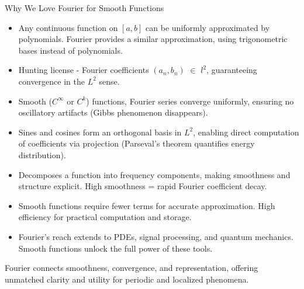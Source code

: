 \begin{frame}[allowframebreaks]{Why We Love Fourier for Smooth Functions}
    \begin{itemize}
        \item {} 
        Any continuous function on \([a, b]\) can be uniformly approximated by polynomials. Fourier provides a similar approximation, using trigonometric bases instead of polynomials.
        
        \item {} 
        Hunting license - Fourier coefficients \((a_n, b_n)\) $\in$ \(l^2\), guaranteeing convergence in the \(L^2\) sense.

        \item {} 
       Smooth (\(C^\infty\) or \(C^k\)) functions, Fourier series converge uniformly, ensuring no oscillatory artifacts (Gibbs phenomenon disappears).

        \item {} 
        Sines and cosines form an orthogonal basis in \(L^2\), enabling direct computation of coefficients via projection (Parseval's theorem quantifies energy distribution).

        \item {} 
        Decomposes a function into frequency components, making smoothness and structure explicit. High smoothness = rapid Fourier coefficient decay.

        \item {} 
        Smooth functions require fewer terms for accurate approximation. High efficiency for practical computation and storage.

        \item {} 
        Fourier's reach extends to PDEs, signal processing, and quantum mechanics. Smooth functions unlock the full power of these tools.
    \end{itemize}
    \vspace{1em}
     Fourier connects smoothness, convergence, and representation, offering unmatched clarity and utility for periodic and localized phenomena.
\end{frame}


